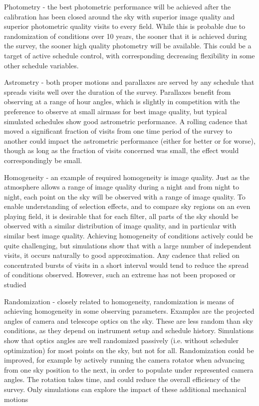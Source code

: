 Photometry - the best photometric performance will be achieved after the calibration has been closed around the sky with superior image quality and superior photometric quality visits to every field.  While this is probable due to randomization of conditions over 10 years, the sooner that it is achieved during the survey, the sooner high quality photometry will be available.  This could be a target of active schedule control, with corresponding decreasing flexibility in some other schedule variables.

Astrometry - both proper motions and parallaxes are served by any schedule that spreads visits well over the duration of the survey.  Parallaxes benefit from observing at a range of hour angles, which is slightly in competition with the preference to observe at small airmass for best image quality, but typical simulated schedules show good astrometric performance. A rolling cadence that moved a significant fraction of visits from one time period of the survey to another could impact the astrometric performance (either for better or for worse), though as long as the fraction of visits concerned was small, the effect would correspondingly be small.

Homogeneity - an  example of required homogeneity is image quality.  Just as the atmosphere allows a range of image quality during a night and from night to night, each point on the sky will be observed with a range of image quality.  To enable understanding of selection effects, and to compare sky regions on an even playing field, it is desirable that for each filter, all parts of the sky should be observed with a similar distribution of image quality, and in particular with similar best image quality. Achieving homogeneity of conditions actively could be quite challenging, but simulations show that with a large number of independent visits, it occurs naturally to good approximation.  Any cadence that relied on concentrated bursts of visits in a short interval  would tend to reduce the spread of conditions observed. However, such an extreme has not been proposed or studied
	
Randomization - closely related to homogeneity, randomization is means of achieving homogeneity in some observing parameters.  Examples are the projected angles of camera and telescope optics on the sky. These are less random than sky conditions, as they depend on instrument setup and schedule history.  Simulations show that optics angles are well randomized passively (i.e. without scheduler optimization) for most points on the sky, but not for all.  Randomization could be improved, for example by actively running the camera rotator when advancing from one sky position to the next, in order to populate under represented camera angles. The rotation takes time, and could reduce the overall efficiency of the survey.  Only simulations can explore the impact of these additional mechanical motions

